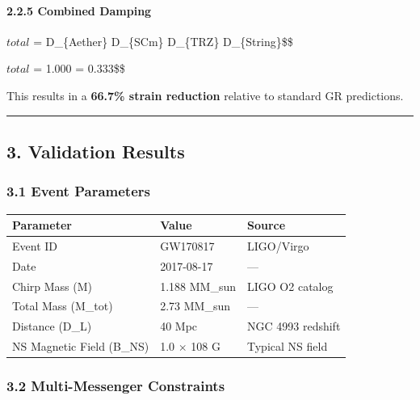 \documentclass[
  11pt,
]{article}
\newcounter{none} %
\begin{document}
\paragraph{2.2.5 Combined Damping}\label{combined-damping}

$total$ = D\_\{Aether\} \times D\_\{SCm\} \times D\_\{TRZ\}
\times D\_\{String\}\$\$

$total$ = 1.000    = 0.333\$\$

This results in a \textbf{66.7\% strain reduction} relative to standard
GR predictions.

\begin{center}\rule{0.5\linewidth}{0.5pt}\end{center}

\subsection{3. Validation Results}\label{validation-results}

\subsubsection{3.1 Event Parameters}\label{event-parameters}

{\def\LTcaptype{none} %
\begin{longtable}[]{@{}lll@{}}
\toprule\noalign{}
Parameter & Value & Source \\
\midrule\noalign{}
\endhead
\bottomrule\noalign{}
\endlastfoot
Event ID & GW170817 & LIGO/Virgo \\
Date & 2017-08-17 & --- \\
Chirp Mass (M) & 1.188 MM\_sun & LIGO O2 catalog \\
Total Mass (M\_tot) & 2.73 MM\_sun & --- \\
Distance (D\_L) & 40 Mpc & NGC 4993 redshift \\
NS Magnetic Field (B\_NS) & 1.0 $\times$ 108 G & Typical NS field \\
\end{longtable}
}

\subsubsection{3.2 Multi-Messenger
Constraints}\label{multi-messenger-constraints}
\end{document}
